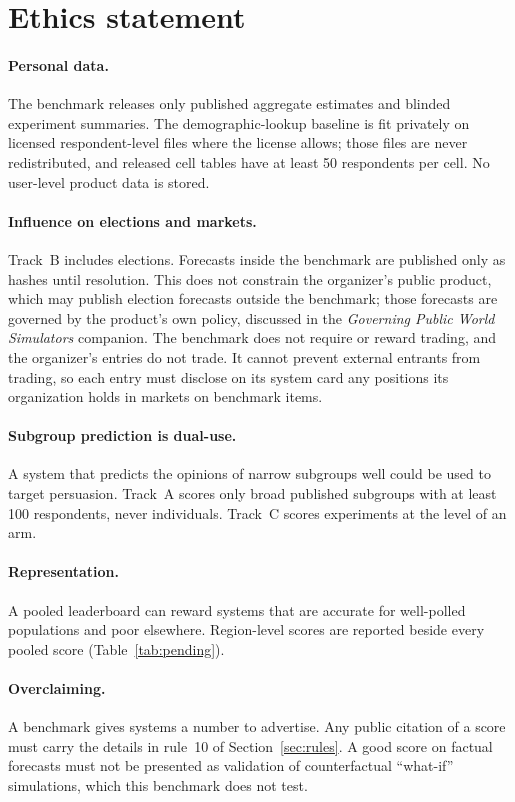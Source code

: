 \documentclass[11pt]{article}
\begin{document}
\section{Ethics statement}

\paragraph{Personal data.} The benchmark releases only published aggregate estimates and blinded experiment summaries. The demographic-lookup baseline is fit privately on licensed respondent-level files where the license allows; those files are never redistributed, and released cell tables have at least 50 respondents per cell. No user-level product data is stored.

\paragraph{Influence on elections and markets.} Track~B includes elections. Forecasts inside the benchmark are published only as hashes until resolution. This does not constrain the organizer's public product, which may publish election forecasts outside the benchmark; those forecasts are governed by the product's own policy, discussed in the \emph{Governing Public World Simulators} companion. The benchmark does not require or reward trading, and the organizer's entries do not trade. It cannot prevent external entrants from trading, so each entry must disclose on its system card any positions its organization holds in markets on benchmark items.

\paragraph{Subgroup prediction is dual-use.} A system that predicts the opinions of narrow subgroups well could be used to target persuasion. Track~A scores only broad published subgroups with at least 100 respondents, never individuals. Track~C scores experiments at the level of an arm.

\paragraph{Representation.} A pooled leaderboard can reward systems that are accurate for well-polled populations and poor elsewhere. Region-level scores are reported beside every pooled score (Table~\ref{tab:pending}).

\paragraph{Overclaiming.} A benchmark gives systems a number to advertise. Any public citation of a score must carry the details in rule~10 of Section~\ref{sec:rules}. A good score on factual forecasts must not be presented as validation of counterfactual ``what-if'' simulations, which this benchmark does not test.
\end{document}
